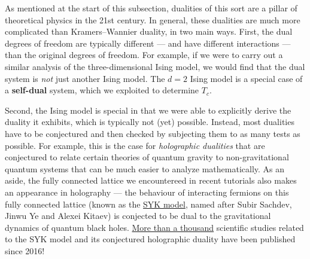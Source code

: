 As mentioned at the start of this subsection, dualities of this sort are a pillar of theoretical physics in the 21st century.
In general, these dualities are much more complicated than Kramers--Wannier duality, in two main ways.
First, the dual degrees of freedom are typically different --- and have different interactions --- than the original degrees of freedom.
For example, if we were to carry out a similar analysis of the three-dimensional Ising model, we would find that the dual system is \textit{not} just another Ising model. %
The $d = 2$ Ising model is a special case of a \textbf{self-dual} system, which we exploited to determine $T_c$.

Second, the Ising model is special in that we were able to explicitly derive the duality it exhibits, which is typically not (yet) possible.
Instead, most dualities have to be conjectured and then checked by subjecting them to as many tests as possible.
For example, this is the case for \textit{holographic dualities} that are conjectured to relate certain theories of quantum gravity to non-gravitational quantum systems that can be much easier to analyze mathematically.
As an aside, the fully connected lattice we encountereed in recent tutorials also makes an appearance in holography --- the behaviour of interacting fermions on this fully connected lattice (known as the \href{https://en.wikipedia.org/wiki/Sachdev-Ye-Kitaev_model}{SYK model}, named after Subir Sachdev, Jinwu Ye and Alexei Kitaev) is conjected to be dual to the gravitational dynamics of quantum black holes.
\href{https://inspirehep.net/literature/342314}{More than a thousand} scientific studies related to the SYK model and its conjectured holographic duality have been published since 2016!
